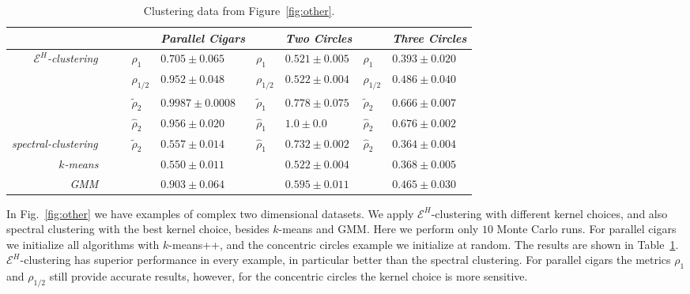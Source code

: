 \documentclass{article}
\newcommand{\xmark}{\ding{55}}
\begin{document}
\begin{table}
\caption{\label{table:other}
Clustering data from Figure~\ref{fig:other}.
}
\begin{center}
\footnotesize{
\begin{tabular}{@{}r  l l  l l  l l@{}}
\toprule[1pt]
 & & \emph{Parallel Cigars}
 & & \emph{Two Circles}
 & & \emph{Three Circles} \\
\midrule[0.5pt]
\multirow{4}{*}{\emph{$\mathcal{E}^H$-clustering~~~~}}
& $\rho_{1}$ & $0.705\pm 0.065$
& $\rho_{1}$ & $0.521\pm 0.005$
& $\rho_{1}$ & $0.393\pm 0.020$ \\
& $\rho_{1/2}$ & $0.952\pm 0.048$
& $\rho_{1/2}$ & $0.522\pm 0.004$
& $\rho_{1/2}$ & $0.486\pm 0.040$ \\
& $\widetilde{\rho}_{2}$ & $\bm{0.9987\pm 0.0008}$
& $\widetilde{\rho}_{1}$ & $0.778\pm 0.075$
& $\widetilde{\rho}_{2}$ & $0.666\pm 0.007$ \\
& $\widehat{\rho}_{2}$  & $0.956\pm 0.020$
& $\widehat{\rho}_{1}$  & $\bm{1.0\pm 0.0}$
& $\widehat{\rho}_{2}$ & $\bm{0.676\pm 0.002}$ \\
\midrule[0.5pt]
\emph{spectral-clustering~~~~}
& $\widetilde{\rho}_{2}$ & $0.557\pm 0.014$ 
& $\widehat{\rho}_{1}$ & $0.732\pm 0.002$ 
& $\widehat{\rho}_{2}$ & $0.364\pm 0.004$  \\
\emph{$k$-means}~~~~ 
& \xmark & $0.550\pm 0.011$
& \xmark & $0.522\pm 0.004$
& \xmark & $0.368\pm 0.005$ \\
\emph{GMM}~~~~
& \xmark & $0.903\pm 0.064$
& \xmark & $0.595\pm 0.011$
& \xmark & $0.465\pm 0.030$ \\
\bottomrule[1pt]
\end{tabular}
}
\end{center}
\end{table}

In Fig.~\ref{fig:other} we have examples of
complex two dimensional datasets. 
We apply $\mathcal{E}^H$-clustering  with different kernel choices,
and also spectral clustering with the best kernel choice, besides 
$k$-means and GMM. Here we perform only $10$ Monte Carlo runs.
For parallel cigars we initialize
all algorithms with $k$-means++, and the concentric circles example
we initialize at random.
The results are shown in Table~\ref{table:other}.
$\mathcal{E}^H$-clustering has superior performance
in every example, in particular better than the
spectral clustering.
For parallel cigars the metrics $\rho_1$ and $\rho_{1/2}$ still provide
accurate results, however, for
the concentric circles the kernel choice is more sensitive.
\end{document}
